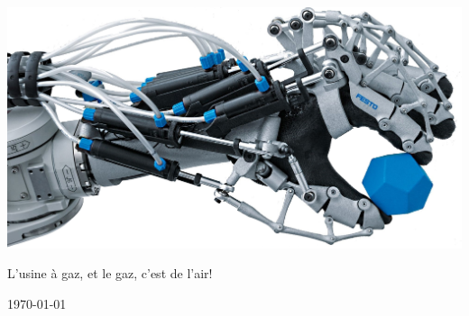 \documentclass[10pt,a4paper,final]{article}
\begin{document}
\begin{center}
\begin{multicols}{2}
\begin{flushright}
\end{flushright}
\end{multicols}

\bigskip
\bigskip


\includegraphics[scale=0.6]{Figures/Picture_for_Title.jpg} 

\vfill
L'usine à gaz, et le gaz, c'est de l'air!
\bigskip

{\large \today}
\end{center}






\pagebreak
\begin{spacing}{1.13999}
\tableofcontents 
\pagebreak
\listoffigures  
\listoftables 
\end{spacing}  
\pagebreak






\renewcommand\headrulewidth{1pt}
\end{document}
